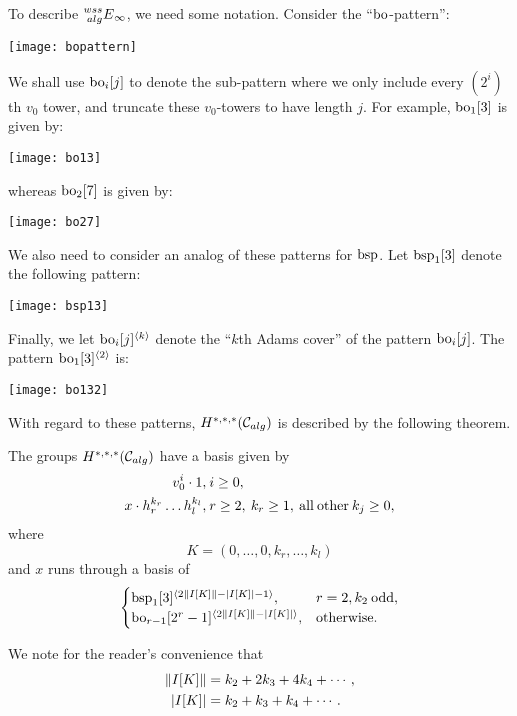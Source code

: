 {To describe $\prescript{wss}{alg}{E}_\infty$, we need some notation.  Consider the ``$\mathrm{bo}$-pattern'':
\begin{center}
\texttt{[image: bopattern]}
\end{center}
We shall use $\mathrm{bo}_i[j]$ to denote the sub-pattern where we only include every $(2^i)$th $v_0$ tower, and truncate these $v_0$-towers to have length $j$.  For example, $\mathrm{bo}_1[3]$ is given by:
\begin{center}
\texttt{[image: bo13]}
\end{center}
whereas $\mathrm{bo}_2[7]$ is given by:
\begin{center}
\texttt{[image: bo27]}
\end{center}
We also need to consider an analog of these patterns for $\mathrm{bsp}$. Let $\mathrm{bsp}_1[3]$ denote the following pattern:
\begin{center}
\texttt{[image: bsp13]}
\end{center}
Finally, we let $\mathrm{bo}_i[j]^{\langle k \rangle}$ denote the ``$k$th Adams cover'' of the pattern $\mathrm{bo}_i[j]$.  The pattern $\mathrm{bo}_1[3]^{\langle 2 \rangle}$ is:
\begin{center}
\texttt{[image: bo132]}
\end{center}

With regard to these patterns, $H^{*,*,*}(\mathcal{C}_{alg})$ is described by
the following theorem.

\begin{thm}\label{thm:HCalg}
The groups $H^{*,*,*}(\mathcal{C}_{alg})$ have a basis given by
\begin{align*}
v_0^i \cdot 1, \: & i \ge 0, \\
x \cdot h_r^{k_r} \ldots h_l^{k_l}, \: & r \ge 2, \: k_r \ge 1, \: \mathrm{all \: other} \: k_j \ge 0, 
\end{align*}
where
$$ K = (0, \ldots, 0, k_r, \ldots, k_l) $$
and $x$ runs through a basis of
$$
\begin{cases}
\mathrm{bsp}_1[3]^{\langle 2\lVert I[K] \rVert-\lvert I[K] \rvert-1 \rangle}, & r = 2, k_2 \: \mathrm{odd}, \\
\mathrm{bo}_{r-1}[2^r-1]^{\langle 2\lVert I[K] \rVert-\lvert I[K] \rvert \rangle}, & \mathrm{otherwise}.
\end{cases}
$$
\end{thm}

\begin{rmk}
We note for the reader's convenience that
\begin{align*}
\lVert I[K] \rVert & = k_2+2k_3+4k_4+\cdots, \\
\lvert I[K] \rvert & = k_2 + k_3 + k_4 + \cdots .
\end{align*}
\end{rmk}


}

